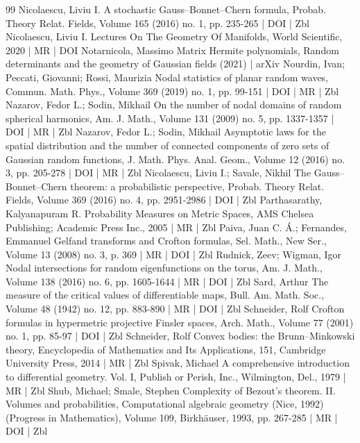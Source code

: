 \documentclass[10pt]{amsart}
\theoremstyle{definition}\newtheorem{defi}[theo]{Definition}\newtheorem{rema}[theo]{Remark}\newtheorem{exam}[theo]{Example}\newtheorem{exem}[theo]{Example}\newtheorem{nota}[theo]{Notation}
\begin{document}
\begin{thebibliography}{99}
Nicolaescu, Liviu I. A stochastic Gauss–Bonnet–Chern formula, Probab. Theory Relat. Fields, Volume 165 (2016) no. 1, pp. 235-265 | DOI | Zbl
Nicolaescu, Liviu I. Lectures On The Geometry Of Manifolds, World Scientific, 2020 | MR | DOI
Notarnicola, Massimo Matrix Hermite polynomials, Random determinants and the geometry of Gaussian fields (2021) | arXiv
Nourdin, Ivan; Peccati, Giovanni; Rossi, Maurizia Nodal statistics of planar random waves, Commun. Math. Phys., Volume 369 (2019) no. 1, pp. 99-151 | DOI | MR | Zbl
Nazarov, Fedor L.; Sodin, Mikhail On the number of nodal domains of random spherical harmonics, Am. J. Math., Volume 131 (2009) no. 5, pp. 1337-1357 | DOI | MR | Zbl
Nazarov, Fedor L.; Sodin, Mikhail Asymptotic laws for the spatial distribution and the number of connected components of zero sets of Gaussian random functions, J. Math. Phys. Anal. Geom., Volume 12 (2016) no. 3, pp. 205-278 | DOI | MR | Zbl
Nicolaescu, Liviu I.; Savale, Nikhil The Gauss–Bonnet–Chern theorem: a probabilistic perspective, Probab. Theory Relat. Fields, Volume 369 (2016) no. 4, pp. 2951-2986 | DOI | Zbl
Parthasarathy, Kalyanapuram R. Probability Measures on Metric Spaces, AMS Chelsea Publishing; Academic Press Inc., 2005 | MR | Zbl
Paiva, Juan C. Á.; Fernandes, Emmanuel Gelfand transforms and Crofton formulas, Sel. Math., New Ser., Volume 13 (2008) no. 3, p. 369 | MR | DOI | Zbl
Rudnick, Zeev; Wigman, Igor Nodal intersections for random eigenfunctions on the torus, Am. J. Math., Volume 138 (2016) no. 6, pp. 1605-1644 | MR | DOI | Zbl
Sard, Arthur The measure of the critical values of differentiable maps, Bull. Am. Math. Soc., Volume 48 (1942) no. 12, pp. 883-890 | MR | DOI | Zbl
Schneider, Rolf Crofton formulas in hypermetric projective Finsler spaces, Arch. Math., Volume 77 (2001) no. 1, pp. 85-97 | DOI | Zbl
Schneider, Rolf Convex bodies: the Brunn–Minkowski theory, Encyclopedia of Mathematics and Its Applications, 151, Cambridge University Press, 2014 | MR | Zbl
Spivak, Michael A comprehensive introduction to differential geometry. Vol. I, Publish or Perish, Inc., Wilmington, Del., 1979 | MR | Zbl
Shub, Michael; Smale, Stephen Complexity of Bezout’s theorem. II. Volumes and probabilities, Computational algebraic geometry (Nice, 1992) (Progress in Mathematics), Volume 109, Birkhäuser, 1993, pp. 267-285 | MR | DOI | Zbl

\end{thebibliography}
\end{document}
